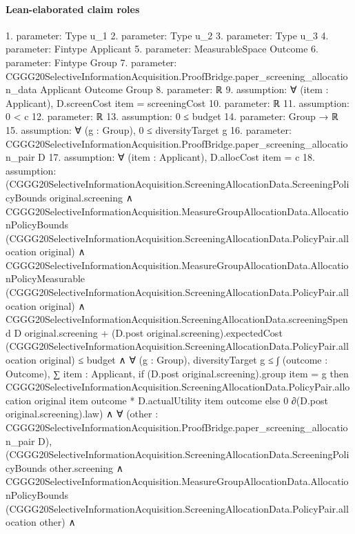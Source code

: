 \documentclass[10pt]{article}
\begin{document}
\paragraph{Lean-elaborated claim roles}\begin{ReviewVerbatim}
1. parameter: Type u_1
2. parameter: Type u_2
3. parameter: Type u_3
4. parameter: Fintype Applicant
5. parameter: MeasurableSpace Outcome
6. parameter: Fintype Group
7. parameter: CGGG20SelectiveInformationAcquisition.ProofBridge.paper_screening_allocation_data Applicant Outcome Group
8. parameter: ℝ
9. assumption: ∀ (item : Applicant), D.screenCost item = screeningCost
10. parameter: ℝ
11. assumption: 0 < c
12. parameter: ℝ
13. assumption: 0 ≤ budget
14. parameter: Group → ℝ
15. assumption: ∀ (g : Group), 0 ≤ diversityTarget g
16. parameter: CGGG20SelectiveInformationAcquisition.ProofBridge.paper_screening_allocation_pair D
17. assumption: ∀ (item : Applicant), D.allocCost item = c
18. assumption: (CGGG20SelectiveInformationAcquisition.ScreeningAllocationData.ScreeningPolicyBounds original.screening ∧
    CGGG20SelectiveInformationAcquisition.MeasureGroupAllocationData.AllocationPolicyBounds
        (CGGG20SelectiveInformationAcquisition.ScreeningAllocationData.PolicyPair.allocation original) ∧
      CGGG20SelectiveInformationAcquisition.MeasureGroupAllocationData.AllocationPolicyMeasurable
          (CGGG20SelectiveInformationAcquisition.ScreeningAllocationData.PolicyPair.allocation original) ∧
        CGGG20SelectiveInformationAcquisition.ScreeningAllocationData.screeningSpend D original.screening +
              (D.post original.screening).expectedCost
                (CGGG20SelectiveInformationAcquisition.ScreeningAllocationData.PolicyPair.allocation original) ≤
            budget ∧
          ∀ (g : Group),
            diversityTarget g ≤
              ∫ (outcome : Outcome),
                ∑ item : Applicant,
                  if (D.post original.screening).group item = g then
                    CGGG20SelectiveInformationAcquisition.ScreeningAllocationData.PolicyPair.allocation original item
                        outcome *
                      D.actualUtility item outcome
                  else 0 ∂(D.post original.screening).law) ∧
  ∀ (other : CGGG20SelectiveInformationAcquisition.ProofBridge.paper_screening_allocation_pair D),
    (CGGG20SelectiveInformationAcquisition.ScreeningAllocationData.ScreeningPolicyBounds other.screening ∧
        CGGG20SelectiveInformationAcquisition.MeasureGroupAllocationData.AllocationPolicyBounds
            (CGGG20SelectiveInformationAcquisition.ScreeningAllocationData.PolicyPair.allocation other) ∧

\end{ReviewVerbatim}
\end{document}
